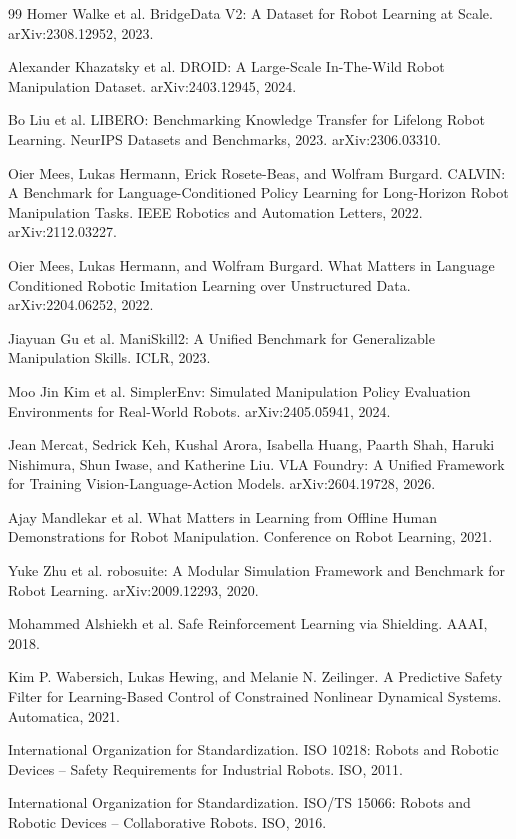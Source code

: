 \documentclass[11pt,oneside,openany]{oblivoir}
\numberwithin{section}{chapter}
\numberwithin{subsection}{section}
\numberwithin{equation}{chapter}
\begin{document}
\begin{thebibliography}{99}
Homer Walke et al.
\newblock BridgeData V2: A Dataset for Robot Learning at Scale.
\newblock arXiv:2308.12952, 2023.

Alexander Khazatsky et al.
\newblock DROID: A Large-Scale In-The-Wild Robot Manipulation Dataset.
\newblock arXiv:2403.12945, 2024.

Bo Liu et al.
\newblock LIBERO: Benchmarking Knowledge Transfer for Lifelong Robot Learning.
\newblock NeurIPS Datasets and Benchmarks, 2023. arXiv:2306.03310.

Oier Mees, Lukas Hermann, Erick Rosete-Beas, and Wolfram Burgard.
\newblock CALVIN: A Benchmark for Language-Conditioned Policy Learning for Long-Horizon Robot Manipulation Tasks.
\newblock IEEE Robotics and Automation Letters, 2022. arXiv:2112.03227.

Oier Mees, Lukas Hermann, and Wolfram Burgard.
\newblock What Matters in Language Conditioned Robotic Imitation Learning over Unstructured Data.
\newblock arXiv:2204.06252, 2022.

Jiayuan Gu et al.
\newblock ManiSkill2: A Unified Benchmark for Generalizable Manipulation Skills.
\newblock ICLR, 2023.

Moo Jin Kim et al.
\newblock SimplerEnv: Simulated Manipulation Policy Evaluation Environments for Real-World Robots.
\newblock arXiv:2405.05941, 2024.

Jean Mercat, Sedrick Keh, Kushal Arora, Isabella Huang, Paarth Shah,
Haruki Nishimura, Shun Iwase, and Katherine Liu.
\newblock VLA Foundry: A Unified Framework for Training Vision-Language-Action Models.
\newblock arXiv:2604.19728, 2026.

Ajay Mandlekar et al.
\newblock What Matters in Learning from Offline Human Demonstrations for Robot Manipulation.
\newblock Conference on Robot Learning, 2021.

Yuke Zhu et al.
\newblock robosuite: A Modular Simulation Framework and Benchmark for Robot Learning.
\newblock arXiv:2009.12293, 2020.

Mohammed Alshiekh et al.
\newblock Safe Reinforcement Learning via Shielding.
\newblock AAAI, 2018.

Kim P. Wabersich, Lukas Hewing, and Melanie N. Zeilinger.
\newblock A Predictive Safety Filter for Learning-Based Control of Constrained Nonlinear Dynamical Systems.
\newblock Automatica, 2021.

International Organization for Standardization.
\newblock ISO 10218: Robots and Robotic Devices -- Safety Requirements for Industrial Robots.
\newblock ISO, 2011.

International Organization for Standardization.
\newblock ISO/TS 15066: Robots and Robotic Devices -- Collaborative Robots.
\newblock ISO, 2016.
\end{thebibliography}
\end{document}
